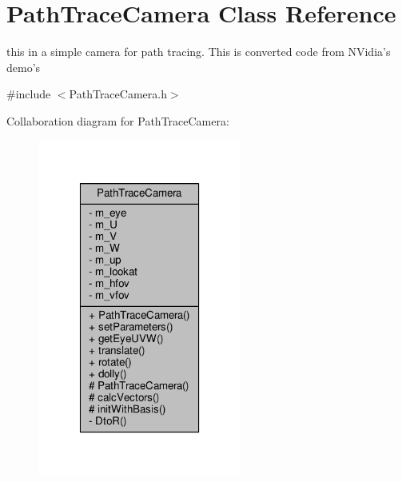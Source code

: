 \hypertarget{class_path_trace_camera}{\section{Path\-Trace\-Camera Class Reference}
\label{class_path_trace_camera}
}


this in a simple camera for path tracing. This is converted code from N\-Vidia's demo's  




{\ttfamily \#include $<$Path\-Trace\-Camera.\-h$>$}



Collaboration diagram for Path\-Trace\-Camera\-:
\nopagebreak
\begin{figure}[H]
\begin{center}
\leavevmode
\includegraphics[width=190pt]{class_path_trace_camera__coll__graph}
\end{center}
\end{figure}
